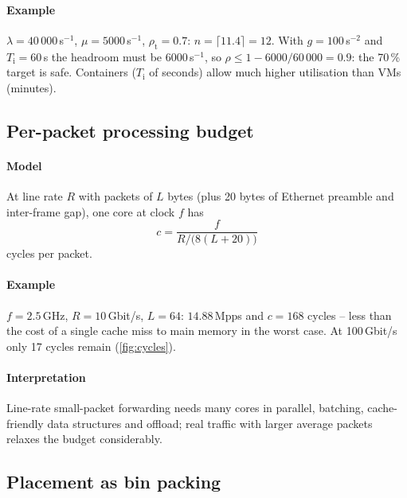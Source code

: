 \documentclass[11pt,a4paper]{article}
\begin{document}
\paragraph{Example} $\lambda = 40\,000$\,s$^{-1}$, $\mu = 5000$\,s$^{-1}$, $\rho_{\mathrm{t}} = 0.7$: $n = \lceil 11.4\rceil = 12$. With
$g = 100$\,s$^{-2}$ and $T_\mathrm{i} = 60$\,s the headroom must be 6000\,s$^{-1}$, so $\rho \le 1 - 6000/60\,000 = 0.9$: the
70\,\% target is safe. Containers ($T_\mathrm{i}$ of seconds) allow much higher utilisation than VMs (minutes).

\subsection{Per-packet processing budget}\label{sec:cycles}
\paragraph{Model} At line rate $R$ with packets of $L$ bytes (plus 20 bytes of Ethernet preamble and inter-frame
gap), one core at clock $f$ has
\begin{equation}\label{eq:cycles}
  c = \frac{f}{R/\bigl(8(L+20)\bigr)}
\end{equation}
cycles per packet.
\paragraph{Example} $f = 2.5$\,GHz, $R = 10$\,Gbit/s, $L = 64$: $14.88$\,Mpps and $c = 168$ cycles -- less than the cost
of a single cache miss to main memory in the worst case. At 100\,Gbit/s only 17 cycles remain (\cref{fig:cycles}).
\paragraph{Interpretation} Line-rate small-packet forwarding needs many cores in parallel, batching, cache-friendly
data structures and offload; real traffic with larger average packets relaxes the budget considerably.

\begin{acnfigure}
  \caption{Cycles available per packet on one 2.5\,GHz core at line rate (\cref{eq:cycles}).}
  \label{fig:cycles}
\end{acnfigure}

\subsection{Placement as bin packing}\label{sec:pack}
\end{document}
